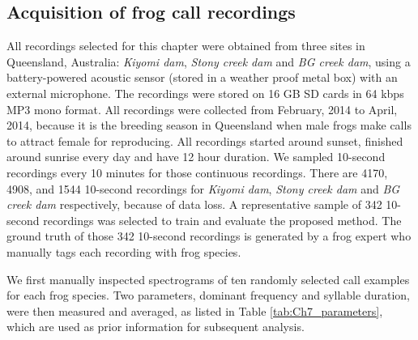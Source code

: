\subsection{Acquisition of frog call recordings}
All recordings selected for this chapter were obtained from three sites in Queensland, Australia: \textit{Kiyomi dam}, \textit{Stony creek dam} and  \textit{BG creek dam}, using a battery-powered acoustic sensor (stored in a weather proof metal box) with an external microphone. The recordings were stored on 16 GB SD cards in 64 kbps MP3 mono format. All recordings were collected from February, 2014 to April, 2014, because it is the breeding season in Queensland when male frogs make calls to attract female for reproducing. All recordings started around sunset, finished around sunrise every day and have 12 hour duration. We sampled 10-second recordings every 10 minutes for those continuous recordings. There are 4170, 4908, and 1544 10-second recordings for \textit{Kiyomi dam}, \textit{Stony creek dam} and \textit{BG creek dam} respectively, because of data loss. A representative sample of 342 10-second recordings was selected to train and evaluate the proposed method. The ground truth of those 342 10-second recordings is generated by a frog expert who manually tags each recording with frog species.

We first manually inspected spectrograms of ten randomly selected call examples for each frog species. Two parameters, dominant frequency and syllable duration, were then measured and averaged, as listed in Table \ref{tab:Ch7_parameters}, which are used as prior information for subsequent analysis.


